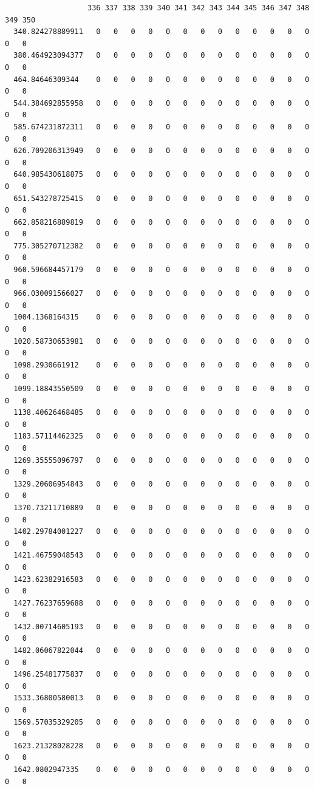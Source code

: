 \documentclass[
  letterpaper,
  DIV=11,
  numbers=noendperiod]{scrartcl}
\begin{document}
\begin{verbatim}
                   336 337 338 339 340 341 342 343 344 345 346 347 348 349 350
  340.824278889911   0   0   0   0   0   0   0   0   0   0   0   0   0   0   0
  380.464923094377   0   0   0   0   0   0   0   0   0   0   0   0   0   0   0
  464.84646309344    0   0   0   0   0   0   0   0   0   0   0   0   0   0   0
  544.384692855958   0   0   0   0   0   0   0   0   0   0   0   0   0   0   0
  585.674231872311   0   0   0   0   0   0   0   0   0   0   0   0   0   0   0
  626.709206313949   0   0   0   0   0   0   0   0   0   0   0   0   0   0   0
  640.985430618875   0   0   0   0   0   0   0   0   0   0   0   0   0   0   0
  651.543278725415   0   0   0   0   0   0   0   0   0   0   0   0   0   0   0
  662.858216889819   0   0   0   0   0   0   0   0   0   0   0   0   0   0   0
  775.305270712382   0   0   0   0   0   0   0   0   0   0   0   0   0   0   0
  960.596684457179   0   0   0   0   0   0   0   0   0   0   0   0   0   0   0
  966.030091566027   0   0   0   0   0   0   0   0   0   0   0   0   0   0   0
  1004.1368164315    0   0   0   0   0   0   0   0   0   0   0   0   0   0   0
  1020.58730653981   0   0   0   0   0   0   0   0   0   0   0   0   0   0   0
  1098.2930661912    0   0   0   0   0   0   0   0   0   0   0   0   0   0   0
  1099.18843550509   0   0   0   0   0   0   0   0   0   0   0   0   0   0   0
  1138.40626468485   0   0   0   0   0   0   0   0   0   0   0   0   0   0   0
  1183.57114462325   0   0   0   0   0   0   0   0   0   0   0   0   0   0   0
  1269.35555096797   0   0   0   0   0   0   0   0   0   0   0   0   0   0   0
  1329.20606954843   0   0   0   0   0   0   0   0   0   0   0   0   0   0   0
  1370.73211710889   0   0   0   0   0   0   0   0   0   0   0   0   0   0   0
  1402.29784001227   0   0   0   0   0   0   0   0   0   0   0   0   0   0   0
  1421.46759048543   0   0   0   0   0   0   0   0   0   0   0   0   0   0   0
  1423.62382916583   0   0   0   0   0   0   0   0   0   0   0   0   0   0   0
  1427.76237659688   0   0   0   0   0   0   0   0   0   0   0   0   0   0   0
  1432.00714605193   0   0   0   0   0   0   0   0   0   0   0   0   0   0   0
  1482.06067822044   0   0   0   0   0   0   0   0   0   0   0   0   0   0   0
  1496.25481775837   0   0   0   0   0   0   0   0   0   0   0   0   0   0   0
  1533.36800580013   0   0   0   0   0   0   0   0   0   0   0   0   0   0   0
  1569.57035329205   0   0   0   0   0   0   0   0   0   0   0   0   0   0   0
  1623.21328028228   0   0   0   0   0   0   0   0   0   0   0   0   0   0   0
  1642.0802947335    0   0   0   0   0   0   0   0   0   0   0   0   0   0   0

\end{verbatim}
\end{document}
